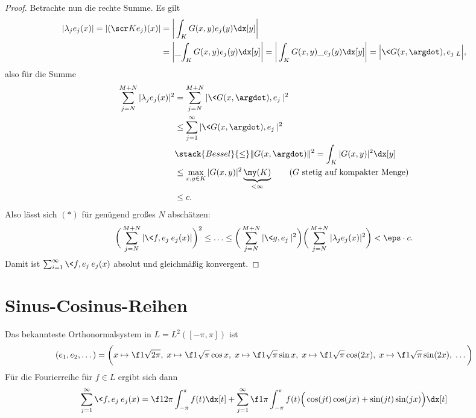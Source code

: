 \begin{st}
\begin{proof}
		Betrachte nun die rechte Summe.
		Es gilt
		\begin{align*}
			|\lambda_j e_j(x)|
			= |(\scr K e_j)(x)| 
			&= \bigg|\int_{K} G(x,y) e_j(y) \dx[y]\bigg|  \\
			&= \bigg|\_{\int_{K} G(x,y) e_j(y) \dx[y]}\bigg| 
			= \bigg|\int_{K} G(x,y) \_{e_j(y)} \dx[y]\bigg| 
			= \Big|\<G(x,\argdot), e_j \>_L \Big|,
		\end{align*}
		also für die Summe
		\begin{align*}
			\sum_{j=N}^{M+N} |\lambda_j e_j(x)|^2
			&= \sum_{j=N}^{M+N} |\<G(x,\argdot), e_j\>|^2 \\
			&\le \sum_{j=1}^\infty |\<G(x,\argdot), e_j\>|^2 \\
			&\stack{Bessel}{\le} \|G(x,\argdot)\|^2 
			= \int_K |G(x,y)|^2 \dx[y]\\
			&\le \max_{x,y \in K} |G(x,y)|^2 \underbrace{\my(K)}_{< \infty}  \qquad \text{($G$ stetig auf kompakter Menge)} \\
			&\le c.
		\end{align*}
		Also lässt sich $(*)$ für genügend großes $N$ abschätzen:
		\[
			\bigg( \sum_{j=N}^{M+N} |\<f,e_j\> e_j(x) | \bigg)^2
			\le \dotsc \le 
			\bigg( \sum_{j=N}^{M+N} |\<g,e_j\>|^2 \bigg) \bigg(\sum_{j=N}^{M+N}|\lambda_j e_j(x)|^2\bigg)
			< \eps \cdot c.
		\]
		Damit ist $\sum_{i=1}^\infty \<f,e_j\>e_j(x)$ absolut und gleichmäßig konvergent.
	\end{proof}
\end{st}


\section{Sinus-Cosinus-Reihen}

Das bekannteste Orthonormalsystem in $L = L^2([-\pi, \pi])$ ist
\begin{align*}
	(e_1, e_2, \dotsc ) = \bigg( x \mapsto \f 1{\sqrt{2\pi}},\; 
	x \mapsto \f 1{\sqrt \pi} \cos x,\; 
	x \mapsto \f 1{\sqrt \pi} \sin x, \;
	x \mapsto \f 1{\sqrt \pi} \cos(2x), \;
	x \mapsto \f 1{\sqrt \pi} \sin(2x),\; \dotsc \bigg)
\end{align*}
Für die Fourierreihe für $f \in L$ ergibt sich dann
\begin{align*}
	\sum_{j=1}^\infty \<f,e_j\> e_j(x)
	= \f 1{2\pi} \int_{-\pi}^{\pi} f(t) \dx[t] + \sum_{j=1}^\infty \f 1{\pi} \int_{-\pi}^{\pi} f(t) \Big( \cos(jt) \cos(jx) + \sin(jt) \sin(jx) \Big) \dx[t]
\end{align*}

